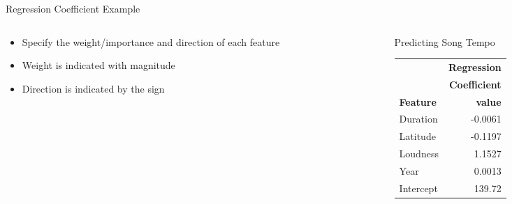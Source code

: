 \documentclass[aspectratio=169]{beamer}
\begin{document}
\begin{frame}{Regression Coefficient Example}

\begin{columns}
\begin{column}{0.5\textwidth}
\begin{itemize}
	\item Specify the weight/importance and direction of each feature
	\item Weight is indicated with magnitude
	\item Direction is indicated by the sign
\end{itemize}
\end{column}
\begin{column}{0.5\textwidth}
Predicting Song Tempo
\begin{tabular}{|l|r|}\hline
& \textbf{Regression } \\ 
& \textbf{ Coefficient } \\ 
\textbf{Feature} & \textbf{value} \\ \hline
Duration       &     -0.0061 \\ \hline
Latitude      &     -0.1197\\ \hline
Loudness          &  1.1527\\  \hline
Year          &  0.0013\\  \hline
Intercept   &     139.72\\  \hline
\end{tabular}
\end{column}
\end{columns}
\end{frame}
\end{document}
